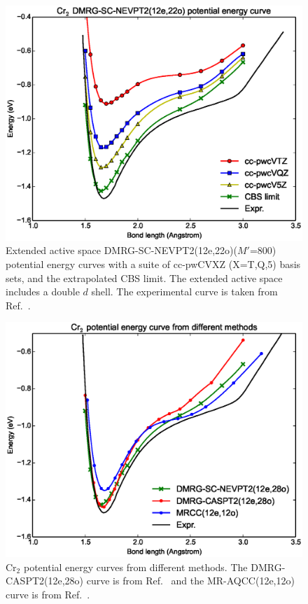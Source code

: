 \begin{figure}
  \centering
  \includegraphics[width=1.1\columnwidth]{Cr2-dmrg-nevpt2.eps}
  \caption{Extended active space DMRG-SC-NEVPT2(12e,22o)($M'$=800) potential energy curves with a suite of cc-pwCVXZ (X=T,Q,5) basis sets,
    and the extrapolated CBS limit. The extended active space includes a double $d$ shell. 
The experimental curve is taken from Ref.~.}
  \label{fig:dmrg-nevpt2}
\end{figure}
\begin{figure}
  \includegraphics[width=1.5\columnwidth]{Cr2-curves.eps}
  \caption{Cr$_2$ potential energy curves from different methods.  The DMRG-CASPT2(12e,28o) curve is from Ref.~ and the MR-AQCC(12e,12o) curve is from Ref.~. }
  \label{fig:compare}
\end{figure}

